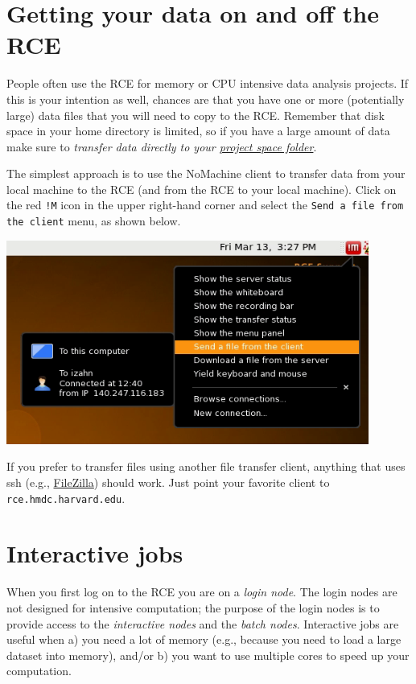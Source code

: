 \documentclass[11pt]{article}
\begin{document}
\section{Getting your data on and off the RCE}
\label{sec:orgdea8c49}
People often use the RCE for memory or CPU intensive data analysis projects. If this is your intention as well, chances are that you have one or more (potentially large) data files that you will need to copy to the RCE. Remember that disk space in your home directory is limited, so if you have a large amount of data make sure to \emph{transfer data directly to your \hyperref[sec:orgfa75bf1]{project space folder}}.

The simplest approach is to use the NoMachine client to transfer data from your local machine to the RCE (and from the RCE to your local machine). Click on the red \texttt{!M} icon in the upper right-hand corner and select the \texttt{Send a file from the client} menu, as shown below.

\begin{center}
\includegraphics[width=.9\linewidth]{images/NoMachineMenu.png}
\end{center}

If you prefer to transfer files using another file transfer client, anything that uses ssh (e.g., \href{http://filezilla-project.org/}{FileZilla}) should work. Just point your favorite client to \texttt{rce.hmdc.harvard.edu}.

\section{Interactive jobs}
\label{sec:orgbb95ba7}
When you first log on to the RCE you are on a \emph{login node}. The login nodes are not designed for intensive computation; the purpose of the login nodes is to provide access to the \emph{interactive nodes} and the \emph{batch nodes}. Interactive jobs are useful when a) you need a lot of memory (e.g., because you need to load a large dataset into memory), and/or b) you want to use multiple cores to speed up your computation.
\end{document}
